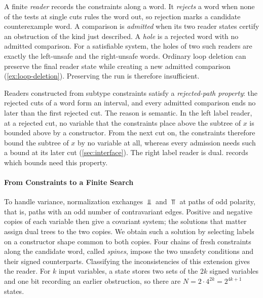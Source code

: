 A finite \emph{reader} records the constraints along a word. It
\emph{rejects} a word when none of the tests at single cuts rules the word
out, so rejection marks a candidate counterexample word. A comparison is
\emph{admitted} when its two reader states certify an obstruction of the
kind just described. A \emph{hole} is a rejected word with no admitted
comparison. For a satisfiable system, the holes of two such readers are
exactly the left-unsafe and the right-unsafe words. Ordinary loop deletion
can preserve the final reader state while creating a new admitted
comparison (\cref{ex:loop-deletion}). Preserving the run is therefore
insufficient.

Readers constructed from subtype constraints satisfy a
\emph{rejected-path property}: the rejected cuts of a word form an
interval, and every admitted comparison ends no later than the first
rejected cut. The reason is semantic. In the left label reader, at a rejected
cut, no variable that the constraints place above the subtree of $x$ is
bounded above by a constructor. From the next cut on, the constraints
therefore bound the subtree of $x$ by no variable at all, whereas every
admission needs such a bound at its later cut (\cref{sec:interface}). The
right label reader is dual.  records which bounds
need this property.

\paragraph{From Constraints to a Finite Search}
To handle variance, normalization exchanges $\Bot$ and $\Top$ at paths
of odd polarity, that is, paths with an odd number of contravariant edges.
Positive and negative copies of each variable then give a covariant
system; the solutions that matter assign dual trees to the two copies. We
obtain such a solution by selecting labels on a constructor shape common to both
copies. Four chains of fresh constraints along the candidate word, called
\emph{spines}, impose the two unsafety conditions and their signed
counterparts. Classifying the inconsistencies of this extension gives the
reader. For $k$ input variables, a state stores two sets of the $2k$ signed
variables and one bit recording an earlier obstruction, so there are
$N=2\cdot4^{2k}=2^{4k+1}$ states.

